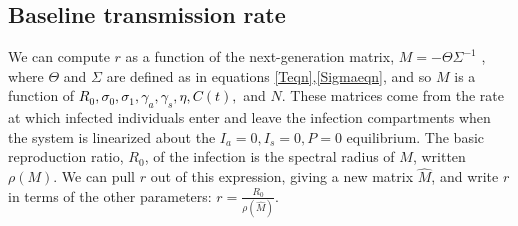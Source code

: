 \subsection{Baseline transmission rate} 

We can compute $r$ as a function of the next-generation matrix, $M = - \Theta \Sigma ^{-1}$  \cite{diekmann2010construction}, where $\Theta$ and $\Sigma$ are defined as in equations \ref{Teqn},\ref{Sigmaeqn}, and so $M$ is a function of \textcolor{black}{ $R_0, \sigma_0,\sigma_1, \gamma_a, \gamma_s, \eta, C(t),$} and $N$. These matrices come from the rate at which infected individuals enter and leave the  infection compartments when the system is linearized about the $I_a = 0, I_s = 0, P = 0$ equilibrium. The basic reproduction ratio, $R_0$, of the infection is the spectral radius of $M$, written $\rho(M)$. We can pull $r$ out of this expression, giving a new matrix $\hat{M}$, and write $r$ in terms of the other parameters: $r = \frac{R_0}{\rho(\hat{M})}$.
\footnotesize
